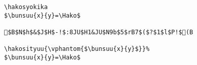 \begin{verbatim}
\hakosyokika
$\bunsuu{x}{y}=\Hako$

$B$N$h$&$J$H$-!$:8JU$H1&JU$N9b$5$rB7$($?$1$l$P!$(B

\hakosityuu{\vphantom{$\bunsuu{x}{y}$}}%
$\bunsuu{x}{y}=\Hako$
\end{verbatim}
